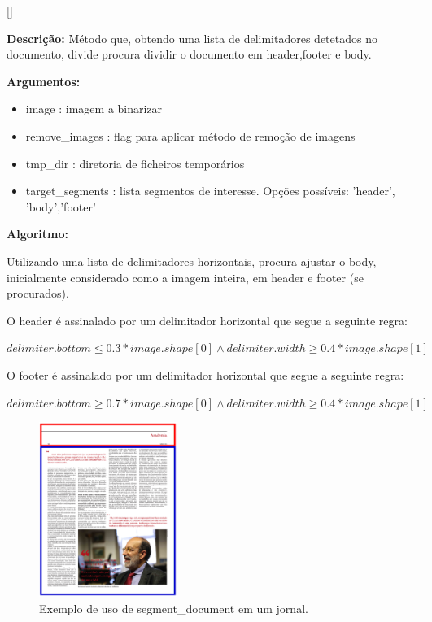 [\normalsize]

\textbf{Descrição:} Método que, obtendo uma lista de delimitadores detetados no documento, divide procura dividir o documento em header,footer e body.


\textbf{Argumentos:}
\begin{itemize}\setlength\itemsep{-0.3em}
	\item image : imagem a binarizar
	\item remove\_images : flag para aplicar método de remoção de imagens
	\item tmp\_dir : diretoria de ficheiros temporários
	\item target\_segments : lista segmentos de interesse. Opções possíveis: 'header', 'body','footer'
\end{itemize}

\textbf{Algoritmo:} 

Utilizando uma lista de delimitadores horizontais, procura ajustar o body, inicialmente considerado como a imagem inteira, em header e footer (se procurados). 

O header é assinalado por um delimitador horizontal que segue a seguinte regra:

$delimiter.bottom \leq 0.3*image.shape[0] \wedge delimiter.width \geq 0.4*image.shape[1]$

O footer é assinalado por um delimitador horizontal que segue a seguinte regra:

$delimiter.bottom \geq 0.7*image.shape[0] \wedge delimiter.width \geq 0.4*image.shape[1]$


\begin{figure}[H]
	\centering
	\includegraphics[width=0.4\textwidth]{images/ilustracoes/segment_document_example.png}
	\caption{Exemplo de uso de segment\_document em um jornal.}
	\label{fig:segment_document_example}
\end{figure}



